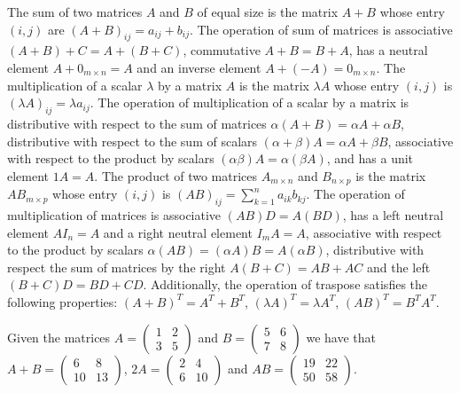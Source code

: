 The sum of two matrices $A$ and $B$ of equal size is the matrix $A + B$ whose entry $(i, j)$ are $(A + B)_{ij} = a_{ij} + b_{ij}$. The operation of sum of matrices is associative $(A + B) + C = A + (B + C)$, commutative $A + B = B + A$, has a neutral element $A + 0_{m \times n} = A$ and an inverse element $A + (-A) = 0_{m \times n}$. The multiplication of a scalar $\lambda$ by a matrix $A$ is the matrix $\lambda A$ whose entry $(i, j)$ is $(\lambda A)_{ij} = \lambda a_{ij}$. The operation of multiplication of a scalar by a matrix is distributive with respect to the sum of matrices $\alpha (A + B) = \alpha A + \alpha B$, distributive with respect to the sum of scalars $(\alpha + \beta) A = \alpha A + \beta B$, associative with respect to the product by scalars $(\alpha \beta) A = \alpha (\beta A)$, and has a unit element $1 A = A$. The product of two matrices $A_{m \times n}$ and $B_{n \times p}$ is the matrix $AB_{m \times p}$ whose entry $(i, j)$ is $(AB)_{ij} = \sum_{k=1}^n a_{ik} b_{kj}$. The operation of multiplication of matrices is associative $(A B) D = A (B D)$, has a left neutral element $A I_n = A$ and a right neutral element $I_m A = A$, associative with respect to the product by scalars $\alpha (A B) = (\alpha A) B = A (\alpha B)$, distributive with respect the sum of matrices by the right $A (B + C) = AB + AC$ and the left $(B + C) D = B D + C D$. Additionally, the operation of traspose satisfies the following properties: $(A + B)^T = A^T + B^T$, $(\lambda A)^T = \lambda A^T$, $(A B)^T = B^T A^T$.

\begin{example}
Given the matrices $A = \left( \begin{smallmatrix} 1 & 2 \\ 3 & 5 \end{smallmatrix} \right)$ and $B = \left( \begin{smallmatrix} 5 & 6 \\ 7 & 8 \end{smallmatrix} \right)$ we have that $A + B = \left( \begin{smallmatrix} 6 & 8 \\ 10 & 13 \end{smallmatrix} \right)$, $2 A = \left( \begin{smallmatrix} 2 & 4 \\ 6 & 10 \end{smallmatrix} \right)$ and $A B = \left( \begin{smallmatrix} 19 & 22 \\ 50 & 58 \end{smallmatrix} \right)$.
\end{example}

